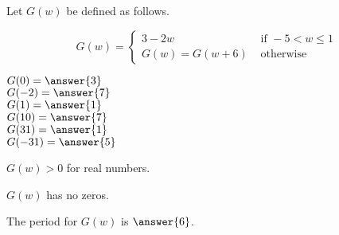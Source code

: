 \documentclass{ximera}
\author{Lee Wayand}
\begin{document}
\begin{exercise}




Let $G(w)$ be defined as follows.

\[
G(w) = 
\begin{cases}
  3 - 2w & \text{ if } -5 < w \leq 1 \\
  G(w) = G(w+6) & \text{ otherwise } 
\end{cases}
\]


\begin{question}

$G(0) = \answer{3}$ \\


$G(-2) = \answer{7}$ \\


$G(1) = \answer{1}$ \\


$G(10) = \answer{7}$ \\


$G(31) = \answer{1}$ \\


$G(-31) = \answer{5}$ \\


\end{question}






\begin{question}


$G(w) > 0$ for real numbers.

\begin{multipleChoice}
\end{multipleChoice}

\end{question}






\begin{question}


$G(w)$ has no zeros.

\begin{multipleChoice}
\end{multipleChoice}

\end{question}






\begin{question}


The period for $G(w)$ is $\answer{6}$.


\end{question}








\end{exercise}
\end{document}
